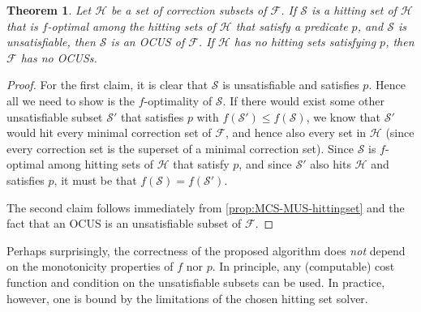 \documentclass[twoside,11pt]{article}
\newcommand\m[1]{\mathcal{#1}}
\newtheorem{theorem}[thm]{Theorem}
\newcommand\formula{\ensuremath{\m{F} }\xspace}
\begin{document}
\begin{theorem}\label{thm:soundcomplete}
	Let $\m{H}$ be a set of correction subsets of \formula. 
	If $\m{S}$ is a hitting set of $\m{H}$ that is $f$-optimal among the hitting sets of $\m{H}$ that satisfy a predicate $p$, and  $\m{S}$ is unsatisfiable, then $\m{S}$ is an OCUS of $\formula$. 
	If  $\m{H}$ has no hitting sets satisfying $p$, then $\formula$ has no OCUSs.
\end{theorem}
\begin{proof}
For the first claim, it is clear that $\m{S}$ is unsatisfiable and satisfies $p$. Hence all we need to show is the $f$-optimality of $\m{S}$.
If there would exist some other unsatisfiable subset $\m{S}'$ that satisfies $p$ with $f(\m{S}')\leq f(\m{S})$, we know that $\m{S}'$ would hit every minimal correction set of $\m{F}$, and hence also every set in $\m{H}$ (since every correction set is the superset of a minimal correction set).
Since $\m{S}$ is $f$-optimal among hitting sets of $\m{H}$ that satisfy $p$, and since $\m{S}'$ also hits $\m{H}$ and satisfies $p$, it must be that $f(\m{S})=f(\m{S}')$. 

The second claim follows immediately from \cref{prop:MCS-MUS-hittingset} and the fact that an OCUS is an unsatisfiable subset of $\formula$. 
\end{proof}

Perhaps surprisingly, the correctness of the proposed algorithm does \emph{not} depend on the monotonicity properties of $f$ nor $p$. In principle, any (computable) cost function and condition on the unsatisfiable subsets can be used. In practice, however, one is bound by the limitations of the chosen hitting set solver.
\end{document}
